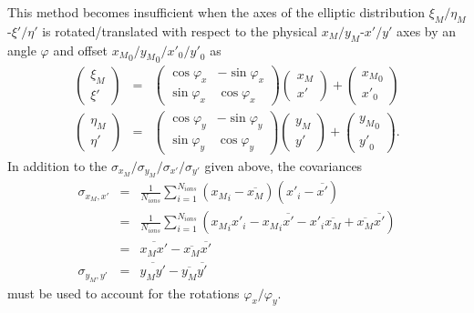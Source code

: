 \documentclass{article}
\begin{document}
This method becomes insufficient when the axes of the elliptic distribution $\xi_M/\eta_M$-$\xi'/\eta'$ is rotated/translated with respect to the physical $x_M/y_M$-$x'/y'$ axes by an angle $\varphi$ and offset ${x_M}_0/{y_M}_0/{x'}_0/{y'}_0$ as
\begin{eqnarray*}
\left( 
\begin{array}{c}
	\xi_M \\
	\xi'
\end{array}
\right) & = & \left(
\begin{array}{cc}
	\cos{\varphi_x} & -\sin{\varphi_x} \\
	\sin{\varphi_x} & \cos{\varphi_x}
\end{array}
\right) \left(
\begin{array}{c}
	x_M \\
	x'
\end{array}
\right) + \left(
\begin{array}{c}
	{x_M}_0 \\
	{x'}_0
\end{array}
\right) \\
\left( 
\begin{array}{c}
	\eta_M \\
	\eta'
\end{array}
\right) & = & \left(
\begin{array}{cc}
	\cos{\varphi_y} & -\sin{\varphi_y} \\
	\sin{\varphi_y} & \cos{\varphi_y}
\end{array}
\right) \left(
\begin{array}{c}
	y_M \\
	y'
\end{array}
\right) + \left(
\begin{array}{c}
	{y_M}_0 \\
	{y'}_0
\end{array}
\right).
\end{eqnarray*}
In addition to the $\sigma_{x_M}/\sigma_{y_M}/\sigma_{x'}/\sigma_{y'}$ given above, the covariances
\begin{eqnarray*}
\sigma_{x_M,x'} & = & \frac{1}{N_{ions}} \sum_{i=1}^{N_{ions}} \left( {x_M}_i - \overline{x_M} \right) \left( {x'}_i - \overline{x'} \right) \\
& = & \frac{1}{N_{ions}} \sum_{i=1}^{N_{ions}} \left( {x_M}_i {x'}_i - {x_M}_i \overline{x'} - {x'}_i \overline{x_M} + \overline{x_M}\overline{x'} \right) \\
& = & \overline{x_M x'} - \overline{x_M} \overline{x'} \\
\sigma_{y_M,y'} & = & \overline{y_M y'} - \overline{y_M}\overline{y'}
\end{eqnarray*}
must be used to account for the rotations $\varphi_x/\varphi_y$. \\
\end{document}
